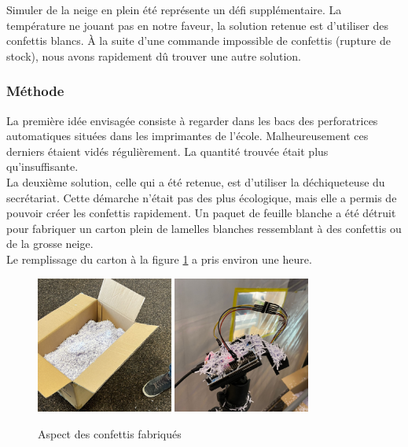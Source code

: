 Simuler de la neige en plein été représente un défi supplémentaire. La température ne jouant pas en notre 
faveur, la solution retenue est d’utiliser des confettis blancs. À la suite d’une commande impossible 
de confettis (rupture de stock), nous avons rapidement dû trouver une autre solution.

\subsubsection{Méthode}

La première idée envisagée consiste à regarder dans les bacs des perforatrices automatiques situées 
dans les imprimantes de l’école. Malheureusement ces derniers étaient vidés régulièrement. La quantité 
trouvée était plus qu’insuffisante.\\
La deuxième solution, celle qui a été retenue, est d’utiliser la déchiqueteuse du secrétariat. Cette 
démarche n’était pas des plus écologique, mais elle a permis de pouvoir créer les confettis rapidement. 
Un paquet de feuille blanche a été détruit pour fabriquer un carton plein de lamelles blanches ressemblant 
à des confettis ou de la grosse neige. \\
Le remplissage du carton à la figure \ref{fig:confettis} a pris environ une heure. 

\begin{figure}[H]
    \centering
    \includegraphics[width=0.4\textwidth]{Images/photos_PGA/ConfBox.jpeg}
    \includegraphics[width=0.4\textwidth]{Images/photos_PGA/conf.jpeg}
    \caption{Aspect des confettis fabriqués}
    \label{fig:confettis}
\end{figure}

